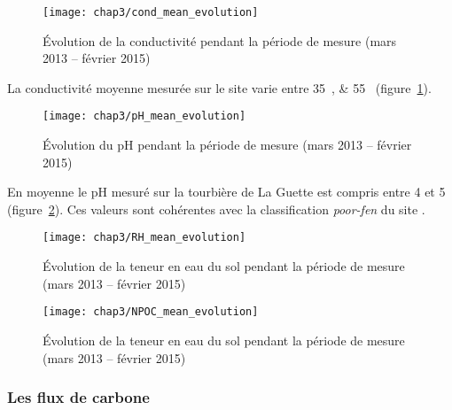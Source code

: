 \begin{figure}
\centering
\texttt{[image: chap3/cond\_mean\_evolution]}
\caption{Évolution de la conductivité pendant la période de mesure (mars 2013 -- février 2015)}
\label{fig:cond_mean_evolution}
\end{figure}

La conductivité moyenne mesurée sur le site varie entre \SIlist{35;55}{\usml} (figure~\ref{fig:cond_mean_evolution}).


\begin{figure}
\centering
\texttt{[image: chap3/pH\_mean\_evolution]}
\caption{Évolution du pH pendant la période de mesure (mars 2013 -- février 2015)}
\label{fig:pH_mean_evolution}
\end{figure}


En moyenne le pH mesuré sur la tourbière de La Guette est compris entre 4 et 5 (figure~\ref{fig:pH_mean_evolution}).
Ces valeurs sont cohérentes avec la classification \textit{poor-fen} du site .


\begin{figure}
\centering
\texttt{[image: chap3/RH\_mean\_evolution]}
\caption{Évolution de la teneur en eau du sol pendant la période de mesure (mars 2013 -- février 2015)}
\label{fig:RH_mean_evolution}
\end{figure}

\begin{figure}
\centering
\texttt{[image: chap3/NPOC\_mean\_evolution]}
\caption{Évolution de la teneur en eau du sol pendant la période de mesure (mars 2013 -- février 2015)}
\label{fig:NPOC_mean_evolution}
\end{figure}


\subsubsection{Les flux de carbone}

